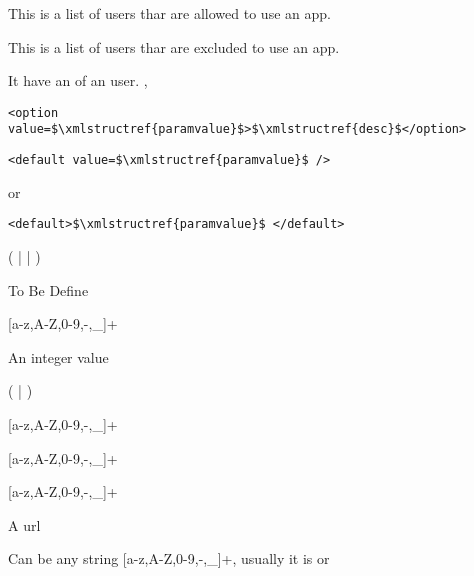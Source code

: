 \bigskip
{}
{This is a list of users thar are allowed to use an app.}
{}

\bigskip
{}
{This is a list of users thar are excluded to use an app.}
{}

\bigskip
{}
{It have an  of an user.}
{, }

\noindent
{}


\begin{lstlisting}
<option value=$\xmlstructref{paramvalue}$>$\xmlstructref{desc}$</option>
\end{lstlisting}

\noindent
{}

\begin{lstlisting}
<default value=$\xmlstructref{paramvalue}$ />
\end{lstlisting}
or
\begin{lstlisting}
<default>$\xmlstructref{paramvalue}$ </default>
\end{lstlisting}

\noindent
{}

(  |  | )

\noindent
{}

To Be Define

\noindent
{}

[a-z,A-Z,0-9,-,\_]+

\noindent
{}

An integer value

\noindent
{}

(  |  )

\noindent
{}

[a-z,A-Z,0-9,-,\_]+

\noindent
{}

[a-z,A-Z,0-9,-,\_]+

\noindent
{}

[a-z,A-Z,0-9,-,\_]+

\noindent
{}

A url

\noindent
{}

Can be any string [a-z,A-Z,0-9,-,\_]+, usually it is  or 

